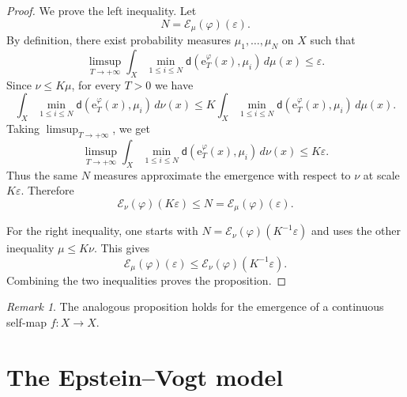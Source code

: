 \documentclass[11pt,reqno]{amsart}
\theoremstyle{plain}
\theoremstyle{definition}
\theoremstyle{remark}
\newtheorem{rmk}[theorem]{Remark}
\theoremstyle{plain}
\numberwithin{equation}{section}
\begin{document}
\begin{proof}
We prove the left inequality. Let
\begin{equation*}
N=\mathcal{E}_{\mu}(\varphi)(\varepsilon).
\end{equation*}
By definition, there exist probability measures
$\mu_1,\dots,\mu_N$ on $X$ such that
\begin{equation*}
\limsup_{T\to+\infty}
\int_X
\min_{1\leq i\leq N}
\mathsf d(\mathrm{e}^{\varphi}_{T}(x),\mu_i)\,d\mu(x)
\leq
\varepsilon.
\end{equation*}
Since $\nu\leq K\mu$, for every $T>0$ we have
\begin{equation*}
\int_X
\min_{1\leq i\leq N}
\mathsf d(\mathrm{e}^{\varphi}_{T}(x),\mu_i)\,d\nu(x)
\leq
K
\int_X
\min_{1\leq i\leq N}
\mathsf d(\mathrm{e}^{\varphi}_{T}(x),\mu_i)\,d\mu(x).
\end{equation*}
Taking $\limsup_{T\to+\infty}$, we get
\begin{equation*}
\limsup_{T\to+\infty}
\int_X
\min_{1\leq i\leq N}
\mathsf d(\mathrm{e}^{\varphi}_{T}(x),\mu_i)\,d\nu(x)
\leq
K\varepsilon.
\end{equation*}
Thus the same $N$ measures approximate the emergence with respect to $\nu$ at
scale $K\varepsilon$. Therefore
\begin{equation*}
\mathcal{E}_{\nu}(\varphi)(K\varepsilon)
\leq
N
=
\mathcal{E}_{\mu}(\varphi)(\varepsilon).
\end{equation*}

For the right inequality, one starts with
$N=\mathcal{E}_{\nu}(\varphi)(K^{-1}\varepsilon)$ and uses the other inequality
$\mu\leq K\nu$. This gives
\begin{equation*}
\mathcal{E}_{\mu}(\varphi)(\varepsilon)
\leq
\mathcal{E}_{\nu}(\varphi)(K^{-1}\varepsilon).
\end{equation*}
Combining the two inequalities proves the proposition.
\end{proof}


				
\begin{rmk}
The analogous proposition holds for the emergence of a continuous self-map $f\colon X\to X$.
\end{rmk}	
						
\section{The Epstein--Vogt model}  \label{section: Epstein-Vogt's counterexample}
\end{document}
